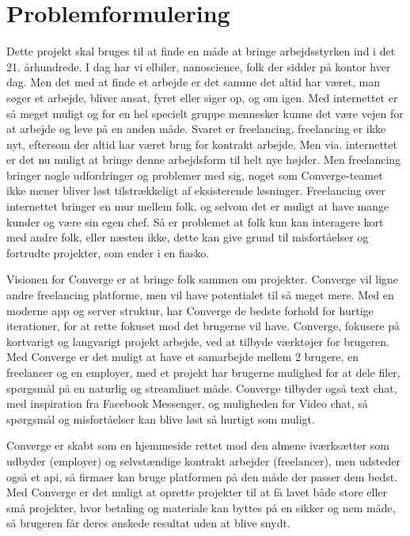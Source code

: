 \section{Problemformulering}

Dette projekt skal bruges til at finde en måde at bringe arbejdsstyrken ind i det 21. århundrede. I dag har vi elbiler, nanoscience, folk der sidder på kontor hver dag. Men det med at finde et arbejde er det samme det altid har været, man søger et arbejde, bliver ansat, fyret eller siger op, og om igen. Med internettet er så meget muligt og for en hel specielt gruppe mennesker kunne det være vejen for at arbejde og leve på en anden måde. Svaret er freelancing, freelancing er ikke nyt, eftersom der altid har været brug for kontrakt arbejde. Men via. internettet er det nu muligt at bringe denne arbejdsform til helt nye højder. Men freelancing bringer nogle udfordringer og problemer med sig, noget som Converge-teamet ikke mener bliver løst tilstrækkeligt af eksisterende løsninger. Freelancing over internettet bringer en mur mellem folk, og selvom det er muligt at have mange kunder og være sin egen chef. Så er problemet at folk kun kan interagere kort med andre folk, eller næsten ikke, dette kan give grund til misfortåelser og fortrudte projekter, som ender i en fiasko.

Visionen for Converge er at bringe folk sammen om projekter. Converge vil ligne andre freelancing platforme, men vil have potentialet til så meget mere. Med en moderne app og server struktur, har Converge de bedste forhold for hurtige iterationer, for at rette fokuset mod det brugerne vil have. Converge, fokusere på kortvarigt og langvarigt projekt arbejde, ved at tilbyde værktøjer for brugeren. Med Converge er det muligt at have et samarbejde mellem 2 brugere, en freelancer og en employer, med et projekt har brugerne mulighed for at dele filer, spørgsmål på en naturlig og streamlinet måde. Converge tilbyder også text chat, med inspiration fra Facebook Messenger, og muligheden for Video chat, så spørgsmål og misfortåelser kan blive løst så hurtigt som muligt. 

Converge er skabt som en hjemmeside rettet mod den almene iværksætter som udbyder (employer) og selvstændige kontrakt arbejder (freelancer), men udsteder også et api, så firmaer kan bruge platformen på den måde der passer dem bedst. Med Converge er det muligt at oprette projekter til at få lavet både store eller små projekter, hvor betaling og materiale kan byttes på en sikker og nem måde, så brugeren får deres ønskede resultat uden at blive snydt.